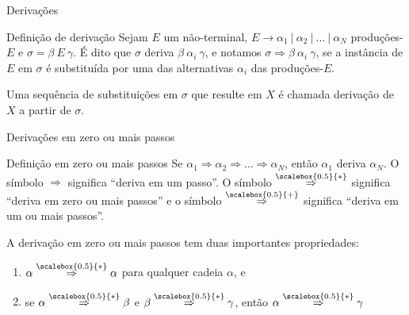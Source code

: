 \begin{frame}[fragile]{Derivações}

    \begin{block}{Definição de derivação}
        Sejam $E$ um não-terminal, $E\to \alpha_1\ |\ \alpha_2\ |\ \ldots \ |\ \alpha_N$ produções-$E$ e $\sigma = \beta\ E\ \gamma$. É dito que $\sigma$ deriva 
            $\beta\ \alpha_i\ \gamma$, e notamos $\sigma \Rightarrow \beta\ \alpha_i\ \gamma$, se a instância de $E$ em $\sigma$ é substituída por uma
            das alternativas $\alpha_i$ das produções-$E$.

        \vspace{0.1in}

        Uma sequência de substituições em $\sigma$ que resulte em $X$ é chamada derivação de $X$ a partir de $\sigma$.
    \end{block}

\end{frame}

\begin{frame}[fragile]{Derivações em zero ou mais passos}

    \begin{block}{Definição em zero ou mais passos}
        Se $\alpha_1 \Rightarrow \alpha_2 \Rightarrow \ldots \Rightarrow \alpha_N$, então $\alpha_1$ deriva $\alpha_N$. O símbolo $\Rightarrow$ significa
        ``deriva em um passo''. O símbolo $\overset{\scalebox{0.5}{*}}{\Rightarrow}$ significa ``deriva em zero ou mais passos'' e o símbolo  $\overset{\scalebox{0.5}{+}}{\Rightarrow}$ significa
        ``deriva em um ou mais passos''.
    
        \vspace{0.1in}

        A derivação em zero ou mais passos tem duas importantes propriedades:
        \begin{enumerate}
            \item $\alpha \overset{\scalebox{0.5}{*}}{\Rightarrow} \alpha$ para qualquer cadeia $\alpha$, e
            \item se $\alpha \overset{\scalebox{0.5}{*}}{\Rightarrow} \beta$ e $\beta \overset{\scalebox{0.5}{*}}{\Rightarrow} \gamma$, então $\alpha \overset{\scalebox{0.5}{*}}{\Rightarrow} \gamma$ 
        \end{enumerate}
    \end{block}

\end{frame}

